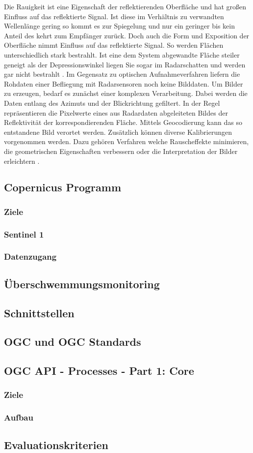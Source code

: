 Die Rauigkeit ist eine Eigenschaft der reflektierenden Oberfläche und hat großen Einfluss auf das reflektierte Signal. Ist diese im Verhältnis zu verwandten
Wellenlänge gering so kommt es zur Spiegelung und nur ein geringer bis kein Anteil des kehrt zum Empfänger zurück. Doch auch die Form und Exposition der Oberfläche nimmt 
Einfluss auf das reflektierte Signal. So werden Flächen unterschiedlich stark bestrahlt. Ist eine dem System abgewandte Fläche steiler geneigt als der Depressionswinkel 
liegen Sie sogar im Radarschatten und werden gar nicht bestrahlt \cite{einfuehrung_in_fernerkundung}. Im Gegensatz zu optischen Aufnahmeverfahren liefern die Rohdaten 
einer Befliegung mit Radarsensoren noch keine Bilddaten. Um Bilder zu erzeugen, bedarf es zunächst einer komplexen Verarbeitung. Dabei werden die Daten entlang des Azimuts und der Blickrichtung gefiltert. 
In der Regel repräsentieren die Pixelwerte eines aus Radardaten abgeleiteten Bildes der Reflektivität der korrespondierenden Fläche. 
Mittels Geocodierung kann das so entstandene Bild verortet werden. Zusätzlich können diverse Kalibrierungen vorgenommen werden. Dazu gehören Verfahren welche Rauscheffekte 
minimieren, die geometrischen Eigenschaften verbessern oder die Interpretation der Bilder erleichtern \cite{tutorial_on_sar}. 

\subsection{Copernicus Programm}
\subsubsection{Ziele}
\subsubsection{Sentinel 1}
\subsubsection{Datenzugang}
\subsection{Überschwemmungsmonitoring}
\subsection{Schnittstellen}
\subsection{OGC und OGC Standards}
\subsection{OGC API - Processes - Part 1: Core}
\subsubsection{Ziele}
\subsubsection{Aufbau}
\subsection{Evaluationskriterien}

